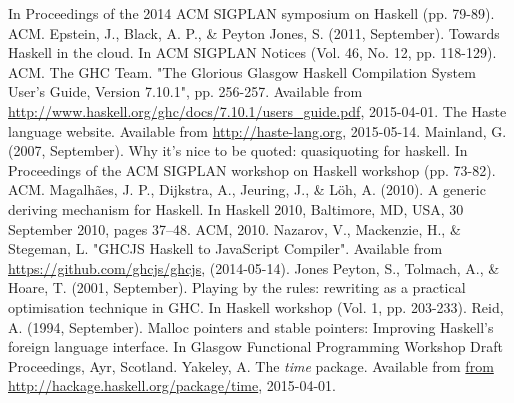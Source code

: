 \documentclass{sigplanconf}
\begin{document}
\begin{thebibliography}{}
  In Proceedings of the 2014 ACM SIGPLAN symposium on Haskell (pp. 79-89). ACM.
  Epstein, J., Black, A. P., \& Peyton Jones, S. (2011, September).
  Towards Haskell in the cloud.
  In ACM SIGPLAN Notices (Vol. 46, No. 12, pp. 118-129). ACM.
  The GHC Team.
  "The Glorious Glasgow Haskell Compilation System User’s Guide, Version 7.10.1",
  pp. 256-257.
  Available from \url{http://www.haskell.org/ghc/docs/7.10.1/users_guide.pdf},
  2015-04-01.
  The Haste language website.
  Available from \url{http://haste-lang.org}, 2015-05-14.
  Mainland, G. (2007, September).
  Why it's nice to be quoted: quasiquoting for haskell.
  In Proceedings of the ACM SIGPLAN workshop on Haskell workshop (pp. 73-82).
  ACM.
  Magalhães, J. P., Dijkstra, A., Jeuring, J., \& Löh, A. (2010).
  A generic deriving mechanism for Haskell.
  In Haskell 2010, Baltimore, MD, USA, 30 September 2010, pages 37–48. ACM, 2010.
  Nazarov, V., Mackenzie, H., \& Stegeman, L.
  "GHCJS Haskell to JavaScript Compiler".
  Available from \url{https://github.com/ghcjs/ghcjs}, (2014-05-14).
  Jones Peyton, S., Tolmach, A., \& Hoare, T. (2001, September).
  Playing by the rules: rewriting as a practical optimisation technique in GHC.
  In Haskell workshop (Vol. 1, pp. 203-233).
  Reid, A. (1994, September).
  Malloc pointers and stable pointers: Improving Haskell's foreign language
  interface.
  In Glasgow Functional Programming Workshop Draft Proceedings, Ayr, Scotland.
  Yakeley, A.
  The \emph{time} package.
  Available from \url{from http://hackage.haskell.org/package/time}, 2015-04-01.

\end{thebibliography}
\end{document}
